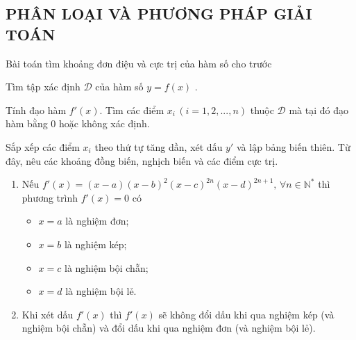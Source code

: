 \begin{enumerate}[\iconMT]
\end{enumerate}
\subsection{PHÂN LOẠI VÀ PHƯƠNG PHÁP GIẢI TOÁN}
\begin{dang}{Bài toán tìm khoảng đơn điệu và cực trị của hàm số cho trước}
	\begin{listEX}[1]
		\item [\ding{172}] Tìm tập xác định $\mathscr{D}$ của hàm số $y=f(x)$ .
		\item [\ding{173}] Tính đạo hàm $f'(x)$. Tìm các điểm $x_i \,(i = 1, 2, ..., n)$ thuộc $\mathscr{D}$ mà tại đó đạo hàm bằng $0$ hoặc không xác định.
		\item [\ding{174}] Sắp xếp các điểm $x_i$ theo thứ tự tăng dần, xét dấu $y'$ và lập bảng biến thiên. Từ đây, nêu các khoảng đồng biến, nghịch biến và các điểm cực trị.
	\end{listEX}
\end{dang}
	\begin{enumerate}[\iconCH]
		\item Nếu $f'(x)=(x-a)(x-b)^2(x-c)^{2n}(x-d)^{2n+1},\,\forall n \in \mathbb{N}^*$
		thì phương trình $f'(x)=0$ có
		\begin{itemize}
			\item 	$x=a$ là nghiệm đơn;
			\item  $x=b$ là nghiệm kép;
			\item  $x=c$ là nghiệm bội chẵn;
			\item  $x=d$ là nghiệm bội lẻ.
		\end{itemize}
		\item Khi xét dấu $f'(x)$ thì $f'(x)$ sẽ không đổi dấu khi qua nghiệm kép (và nghiệm bội chẵn) và đổi dấu khi qua nghiệm đơn (và nghiệm bội lẻ).
	\end{enumerate}
